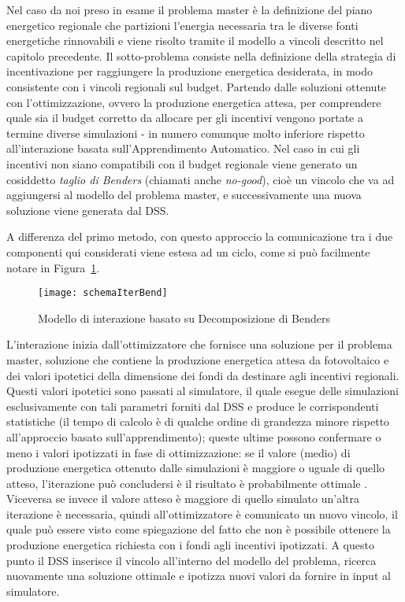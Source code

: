 \documentclass[12pt,a4paper,openright,twoside]{report}
\begin{document}
Nel caso da noi preso in esame il problema master è la definizione del piano energetico regionale che partizioni l'energia necessaria tra le diverse fonti energetiche rinnovabili e viene risolto tramite il modello a vincoli descritto nel capitolo precedente. Il sotto-problema consiste nella definizione della strategia di incentivazione per raggiungere la produzione energetica desiderata, in modo consistente con i vincoli regionali sul budget. Partendo dalle soluzioni ottenute con l'ottimizzazione, ovvero la produzione energetica attesa, per comprendere quale sia il budget corretto da allocare per gli incentivi vengono portate a termine diverse simulazioni - in numero comunque molto inferiore rispetto all'interazione basata sull'Apprendimento Automatico. Nel caso in cui gli incentivi non siano compatibili con il budget regionale viene generato un cosiddetto \emph{taglio di Benders} (chiamati anche \emph{no-good}), cioè un vincolo che va ad aggiungersi al modello del problema master, e successivamente una nuova soluzione viene generata dal DSS. 

A differenza del primo metodo, con questo approccio la comunicazione tra i due componenti qui considerati viene estesa ad un ciclo, come si può facilmente notare in Figura~\ref{schemaIterBend}.

\begin{figure}[htb]
	\begin{center}
	\texttt{[image: schemaIterBend]}
	\end{center}
	\caption{Modello di interazione basato su Decomposizione di Benders}
  	\label{schemaIterBend}
\end{figure}

L'interazione inizia dall'ottimizzatore che fornisce una soluzione per il problema master, soluzione che contiene la produzione energetica attesa da fotovoltaico e dei valori ipotetici della dimensione dei fondi da destinare agli incentivi regionali. Questi valori ipotetici sono passati al simulatore, il quale esegue delle simulazioni esclusivamente con tali parametri forniti dal DSS e produce le corrispondenti statistiche (il tempo di calcolo è di qualche ordine di grandezza minore rispetto all'approccio basato sull'apprendimento); queste ultime possono confermare o meno i valori ipotizzati in fase di ottimizzazione: se il valore (medio) di produzione energetica ottenuto dalle simulazioni è maggiore o uguale di quello atteso, l'iterazione può concludersi è il risultato è probabilmente ottimale \cite{bendersDec}. Viceversa se invece il valore atteso è maggiore di quello simulato un'altra iterazione è necessaria, quindi  all'ottimizzatore è comunicato un nuovo vincolo, il quale può essere visto come spiegazione del fatto che non è possibile ottenere la produzione energetica richiesta con i fondi agli incentivi ipotizzati. A questo punto il DSS inserisce il vincolo all'interno del modello del problema, ricerca nuovamente una soluzione ottimale e ipotizza nuovi valori da fornire in input al simulatore.
\end{document}
